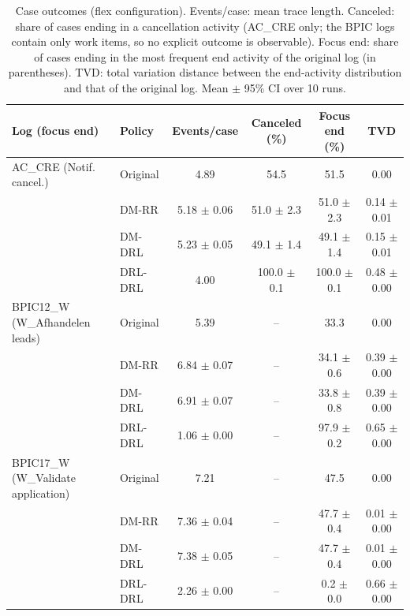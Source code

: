 \begin{table}[t]
\centering
\caption{Case outcomes (flex configuration). Events/case: mean trace length. Canceled: share of cases ending in a cancellation activity (AC\_CRE only; the BPIC logs contain only work items, so no explicit outcome is observable). Focus end: share of cases ending in the most frequent end activity of the original log (in parentheses). TVD: total variation distance between the end-activity distribution and that of the original log. Mean $\pm$ 95\% CI over 10 runs.}
\label{tab:case-outcomes}
\small
\begin{tabular}{llcccc}
\toprule
Log (focus end) & Policy & Events/case & Canceled (\%) & Focus end (\%) & TVD \\
\midrule
AC\_CRE (Notif. cancel.) & Original & 4.89 & 54.5 & 51.5 & 0.00 \\
 & DM-RR & 5.18 $\pm$ 0.06 & 51.0 $\pm$ 2.3 & 51.0 $\pm$ 2.3 & 0.14 $\pm$ 0.01 \\
 & DM-DRL & 5.23 $\pm$ 0.05 & 49.1 $\pm$ 1.4 & 49.1 $\pm$ 1.4 & 0.15 $\pm$ 0.01 \\
 & DRL-DRL & 4.00 & 100.0 $\pm$ 0.1 & 100.0 $\pm$ 0.1 & 0.48 $\pm$ 0.00 \\
\midrule
BPIC12\_W (W\_Afhandelen leads) & Original & 5.39 & -- & 33.3 & 0.00 \\
 & DM-RR & 6.84 $\pm$ 0.07 & -- & 34.1 $\pm$ 0.6 & 0.39 $\pm$ 0.00 \\
 & DM-DRL & 6.91 $\pm$ 0.07 & -- & 33.8 $\pm$ 0.8 & 0.39 $\pm$ 0.00 \\
 & DRL-DRL & 1.06 $\pm$ 0.00 & -- & 97.9 $\pm$ 0.2 & 0.65 $\pm$ 0.00 \\
\midrule
BPIC17\_W (W\_Validate application) & Original & 7.21 & -- & 47.5 & 0.00 \\
 & DM-RR & 7.36 $\pm$ 0.04 & -- & 47.7 $\pm$ 0.4 & 0.01 $\pm$ 0.00 \\
 & DM-DRL & 7.38 $\pm$ 0.05 & -- & 47.7 $\pm$ 0.4 & 0.01 $\pm$ 0.00 \\
 & DRL-DRL & 2.26 $\pm$ 0.00 & -- & 0.2 $\pm$ 0.0 & 0.66 $\pm$ 0.00 \\
\bottomrule
\end{tabular}
\end{table}
